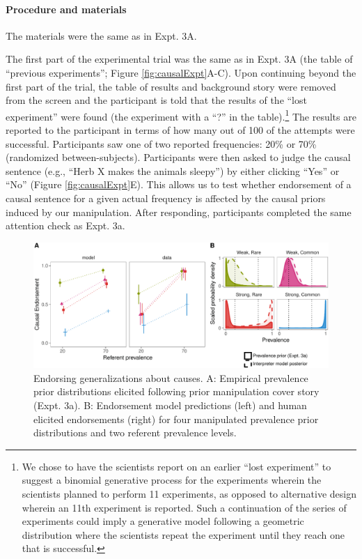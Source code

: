 \documentclass[english,,man,floatsintext]{apa6}
\let\oldparagraph\paragraph
\renewcommand{\paragraph}[1]{\oldparagraph{#1}\mbox{}}
\let\rmarkdownfootnote\footnote%
\def\footnote{\protect\rmarkdownfootnote}
\theoremstyle{definition}
\theoremstyle{definition}
\theoremstyle{definition}
\theoremstyle{remark}
\begin{document}
\hypertarget{procedure-and-materials-2}{%
\paragraph{Procedure and materials}\label{procedure-and-materials-2}}

The materials were the same as in Expt. 3A.

The first part of the experimental trial was the same as in Expt. 3A
(the table of \enquote{previous experiments}; Figure
\ref{fig:causalExpt}A-C). Upon continuing beyond the first part of the
trial, the table of results and background story were removed from the
screen and the participant is told that the results of the \enquote{lost
experiment} were found (the experiment with a \enquote{?} in the
table).\footnote{We chose to have the scientists report on an earlier
  \enquote{lost experiment} to suggest a binomial generative process for
  the experiments wherein the scientists planned to perform 11
  experiments, as opposed to alternative design wherein an 11th
  experiment is reported. Such a continuation of the series of
  experiments could imply a generative model following a geometric
  distribution where the scientists repeat the experiment until they
  reach one that is successful.} The results are reported to the
participant in terms of how many out of 100 of the attempts were
successful. Participants saw one of two reported frequencies: 20\% or
70\% (randomized between-subjects). Participants were then asked to
judge the causal sentence (e.g., \enquote{Herb X makes the animals
sleepy}) by either clicking \enquote{Yes} or \enquote{No} (Figure
\ref{fig:causalExpt}E). This allows us to test whether endorsement of a
causal sentence for a given actual frequency is affected by the causal
priors induced by our manipulation. After responding, participants
completed the same attention check as Expt. 3a.

\begin{figure}[!h]
\includegraphics[width=\textwidth]{figs/figure-causals-1} \caption{Endorsing generalizations about causes. A: Empirical prevalence prior distributions elicited following prior manipulation cover story (Expt. 3a). B: Endorsement model predictions (left) and human elicited endorsements (right) for four manipulated prevalence prior distributions and two referent prevalence levels.}\label{fig:figure-causals}
\end{figure}
\end{document}
